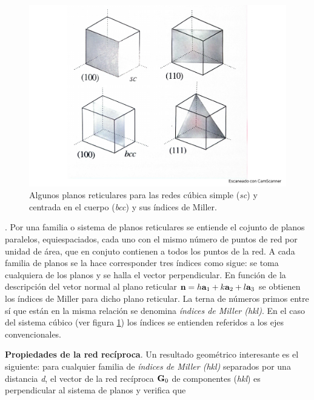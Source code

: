 \begin{figure}[h!] \centering
\includegraphics[scale=0.40]{Cuerpo/Ch_02/Fotos_libro 1.pdf}
\caption{Algunos planos reticulares para las redes cúbica simple (\textit{sc}) y centrada en el cuerpo (\textit{bcc}) y sus índices de Miller.}
\label{Fig:02-01}
\end{figure}

\begin{definition}. Por una familia o sistema de planos reticulares se entiende el cojunto de planos paralelos, equiespaciados, cada uno con el mismo número de puntos de red por unidad de área, que en conjuto contienen a todos los puntos de la red. A cada familia de planos se la hace corresponder tres índices como sigue: se toma cualquiera de los planos y se halla el vector perpendicular. En función de la descripción del vetor normal al plano reticular $\mathbf{n}=h\mathbf{a}_1+k\mathbf{a}_2+l\mathbf{a}_3$ se obtienen los índices de Miller para dicho plano reticular. La terna de números primos entre sí que están en la misma relación se denomina \textit{índices de Miller (hkl)}. En el caso del sistema cúbico (ver figura \ref{Fig:02-01}) los índices se entienden referidos a los ejes convencionales.    
\end{definition}


\textbf{Propiedades de la red recíproca}. Un resultado  geométrico interesante es el siguiente: para cualquier familia de \textit{índices de Miller (hkl)} separados por una distancia \textit{d}, el vector de la red recíproca $\mathbf{G}_0$ de componentes (\textit{hkl}) es perpendicular al sistema de planos y verifica que

